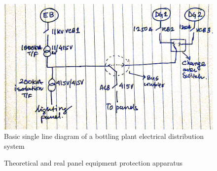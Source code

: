 \documentclass{report}
\begin{document}
		\begin{figure}[h]
		\centering
		\includegraphics[width=\linewidth]{bp_singlelinediag}
		\caption{Basic single line diagram of a bottling plant electrical distribution system}
		\label{bp_singlelinediag}
	\end{figure}
	\begin{figure}[h]
		\centering
		\caption{Theoretical and real panel equipment protection apparatus}
		\label{bp_panel}
	\end{figure}
\end{document}
